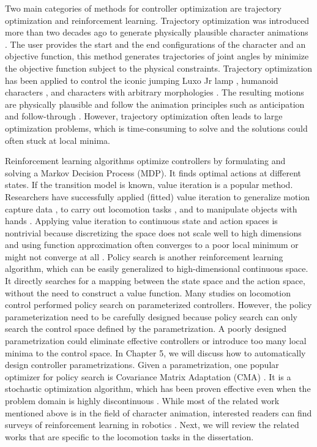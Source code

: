 Two main categories of methods for controller optimization are trajectory optimization and reinforcement learning. Trajectory optimization was introduced more than two decades ago to generate physically plausible character animations \cite{Witkin:1988}. The user provides the start and the end configurations of the character and an objective function, this method generates trajectories of joint angles by minimize the objective function subject to the physical constraints. Trajectory optimization has been applied to control the iconic jumping Luxo Jr lamp \cite{Witkin:1988}, humanoid characters \cite{Liu:2002,Jain:2009,Ye:2010}, and characters with arbitrary morphologies \cite{Wampler:2009}. The resulting motions are physically plausible and follow the animation principles such as anticipation and follow-through \cite{thomas:1995}. However, trajectory optimization often leads to large optimization problems, which is time-consuming to solve and the solutions could often stuck at local minima.

Reinforcement learning algorithms optimize controllers by formulating and solving a Markov Decision Process (MDP). It finds optimal actions at different states. If the transition model is known, value iteration is a popular method. Researchers have successfully applied (fitted) value iteration to generalize motion capture data \cite{Treuille:2007:NCA,Levine:2012:CCC}, to carry out locomotion tasks \cite{Coros:2009:RTC}, and to manipulate objects with hands \cite{Multifinger2013}. Applying value iteration to continuous state and action spaces is nontrivial because discretizing the space does not scale well to high dimensions \cite{Sutton:1998:IRL} and using function approximation often converges to a poor local minimum or might not converge at all \cite{Thrun93issuesin,Boyan95generalizationin}. Policy search \cite{Ng:2000:PPS} is another reinforcement learning algorithm, which can be easily generalized to high-dimensional continuous space. It directly searches for a mapping between the state space and the action space, without the need to construct a value function. Many studies on locomotion control \cite{Yin08,Wang:2009,Coros:2011,Wang:2012,Geijtenbeek:2013} performed policy search on parameterized controllers. However, the policy parameterization need to be carefully designed because policy search can only search the control space defined by the parametrization. A poorly designed parametrization could eliminate effective controllers or introduce too many local minima to the control space. In Chapter 5, we will discuss how to automatically design controller parametrizations. Given a parametrization, one popular optimizer for policy search is Covariance Matrix Adaptation (CMA) \cite{hansen2004evaluating}. It is a stochastic optimization algorithm, which has been proven effective even when the problem domain is highly discontinuous \cite{Wu:2010:TAB,Wang:2010,Mordatch:2010:RPL}. While most of the related work mentioned above is in the field of character animation, interested readers can find surveys of reinforcement learning in robotics \cite{Bagnell:2013}. Next, we will review the related works that are specific to the locomotion tasks in the dissertation.

